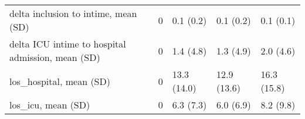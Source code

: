 \begin{tabular}{lllll}
delta inclusion to intime, mean (SD)              &       0 &      0.1 (0.2) &         0.1 (0.2) &              0.1 (0.1) \\
delta ICU intime to hospital admission, mean (SD) &       0 &      1.4 (4.8) &         1.3 (4.9) &              2.0 (4.6) \\
los\_hospital, mean (SD)                           &       0 &    13.3 (14.0) &       12.9 (13.6) &            16.3 (15.8) \\
los\_icu, mean (SD)                                &       0 &      6.3 (7.3) &         6.0 (6.9) &              8.2 (9.8) \\
\bottomrule
\end{tabular}
